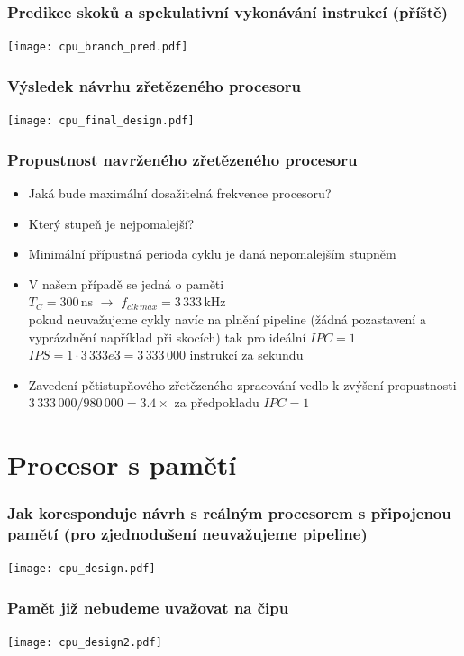 \documentclass{beamer}
\begin{document}

\begin{frame}
\frametitle{Predikce skoků a spekulativní vykonávání instrukcí (příště)}
\texttt{[image: cpu\_branch\_pred.pdf]}
\end{frame}

\begin{frame}
\frametitle{Výsledek návrhu zřetězeného procesoru}
\texttt{[image: cpu\_final\_design.pdf]}
\end{frame}

\begin{frame}
\frametitle{Propustnost navrženého zřetězeného procesoru}

\begin{itemize}
 \item Jaká bude maximální dosažitelná frekvence procesoru?
 \item Který stupeň je nejpomalejší?
 \item Minimální přípustná perioda cyklu je daná nepomalejším stupněm
 \item V našem případě se jedná o paměti \\
       $T_C = 300$\,ns $\rightarrow$ $f_{clk\,max} = 3\,333$\,kHz \\
       pokud neuvažujeme cykly navíc na plnění pipeline (žádná pozastavení
       a vyprázdnění například při skocích) tak pro ideální $IPC = 1$ \\
       $IPS = 1 \cdot 3\,333e3 = 3\,333\,000$ instrukcí za sekundu
 \item Zavedení pětistupňového zřetězeného zpracování vedlo k zvýšení
       propustnosti $3\,333\,000 / 980\,000 = 3.4 \times$ za předpokladu $IPC = 1$
\end{itemize}

\end{frame}

\section{Procesor s pamětí}

\begin{frame}
\frametitle{Jak koresponduje návrh s reálným procesorem s připojenou pamětí (pro zjednodušení neuvažujeme pipeline)}
\texttt{[image: cpu\_design.pdf]}
\end{frame}

\begin{frame}
\frametitle{Pamět již nebudeme uvažovat na čipu}
\texttt{[image: cpu\_design2.pdf]}
\end{frame}
\end{document}
